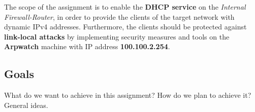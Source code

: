 The scope of the assignment is to enable the \textbf{DHCP service} on the \textit{Internal Firewall-Router}, in order to provide the clients of the target network with dynamic IPv4 addresses. Furthermore, the clients should be protected against \textbf{link-local attacks} by implementing security measures and tools on the \textbf{Arpwatch} machine with IP address \textbf{100.100.2.254}.

\subsection{Goals}
What do we want to achieve in this assignment? How do we plan to achieve it?
General ideas.
